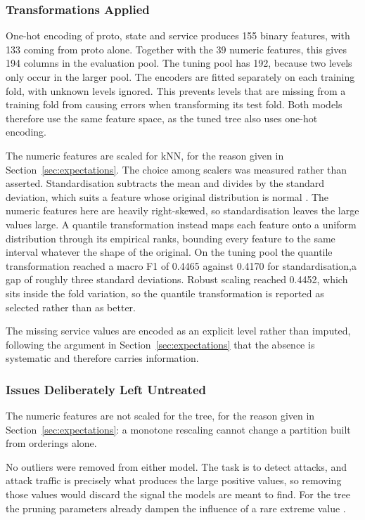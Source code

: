 \documentclass[conference]{IEEEtran}
\begin{document}
\subsubsection{Transformations Applied}

One-hot encoding of proto, state and service produces 155 binary features, with 
133 coming from proto alone. Together with the 39 numeric features, this gives 
194 columns in the evaluation pool. The tuning pool has 192, because two levels 
only occur in the larger pool. The encoders are fitted separately on each 
training fold, with unknown levels ignored. This prevents levels that are 
missing from a training fold from causing errors when transforming its test fold. 
Both models therefore use the same feature space, as the tuned tree also uses 
one-hot encoding.

The numeric features are scaled for kNN, for the reason given in
Section~\ref{sec:expectations}. The choice among scalers was measured rather
than asserted. Standardisation subtracts the mean and divides by the standard
deviation, which suits a feature whose original distribution is normal
\cite{topic3}. The numeric features here are heavily right-skewed, so
standardisation leaves the large values large. A quantile transformation
instead maps each feature onto a uniform distribution through its empirical
ranks, bounding every feature to the same interval whatever the shape of the
original. On the tuning pool the quantile transformation reached a macro F1 of
0.4465 against 0.4170 for standardisation,a gap of roughly three standard
deviations. Robust scaling reached 0.4452, which sits inside the fold
variation, so the quantile transformation is reported as selected rather than
as better.

The missing service values are encoded as an explicit level rather than
imputed, following the argument in Section~\ref{sec:expectations} that the
absence is systematic and therefore carries information.

\subsubsection{Issues Deliberately Left Untreated}

The numeric features are not scaled for the tree, for the reason given in
Section~\ref{sec:expectations}: a monotone rescaling cannot change a partition
built from orderings alone.

No outliers were removed from either model. The task is to detect attacks, and
attack traffic is precisely what produces the large positive values, so
removing those values would discard the signal the models are meant to find.
For the tree the pruning parameters already dampen the influence of a rare
extreme value \cite{topic4,kelleher2015}.
\end{document}
